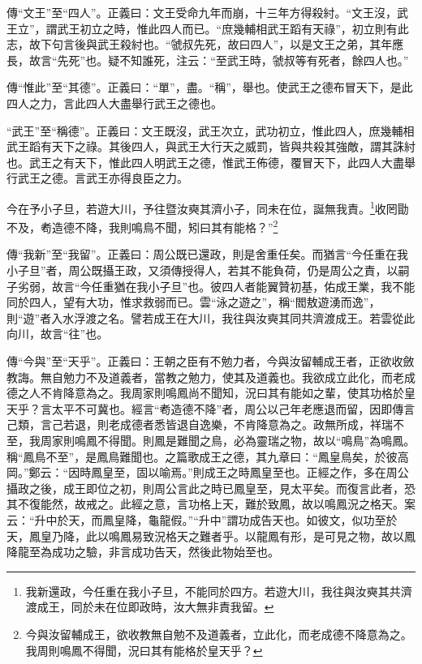 {\noindent\zhuan{}\fzbyks 傳“文王”至“四人”。正義曰：文王受命九年而崩，十三年方得殺紂。“文王沒，武王立”，謂武王初立之時，惟此四人而已。“庶幾輔相武王蹈有天祿”，初立則有此志，故下句言後與武王殺紂也。“虢叔先死，故曰四人”，以是文王之弟，其年應長，故言“先死”也。疑不知誰死，注云：“至武王時，虢叔等有死者，餘四人也。” \par}

{\noindent\zhuan{}\fzbyks 傳“惟此”至“其德”。正義曰：“單”，盡。“稱”，舉也。使武王之德布冒天下，是此四人之力，言此四人大盡舉行武王之德也。 \par}

{\noindent\shu{}\fzkt “武王”至“稱德”。正義曰：文王既沒，武王次立，武功初立，惟此四人，庶幾輔相武王蹈有天下之祿。其後四人，與武王大行天之威罰，皆與共殺其強敵，謂其誅紂也。武王之有天下，惟此四人明武王之德，惟武王佈德，覆冒天下，此四人大盡舉行武王之德。言武王亦得良臣之力。 \par}

今在予小子旦，若遊大川，予往暨汝奭其濟小子，同未在位，誕無我責。\footnote{我新還政，今任重在我小子旦，不能同於四方。若遊大川，我往與汝奭其共濟渡成王，同於未在位即政時，汝大無非責我留。}收罔勖不及，耇造德不降，我則鳴鳥不聞，矧曰其有能格？”\footnote{今與汝留輔成王，欲收教無自勉不及道義者，立此化，而老成德不降意為之。我周則鳴鳳不得聞，況曰其有能格於皇天乎？}


{\noindent\zhuan{}\fzbyks 傳“我新”至“我留”。正義曰：周公既已還政，則是舍重任矣。而猶言“今任重在我小子旦”者，周公既攝王政，又須傳授得人，若其不能負荷，仍是周公之責，以嗣子劣弱，故言“今任重猶在我小子旦”也。彼四人者能翼贊初基，佑成王業，我不能同於四人，望有大功，惟求救弱而已。雲“泳之遊之”，稱“閻敖遊湧而逸”，則“遊”者入水浮渡之名。譬若成王在大川，我往與汝奭其同共濟渡成王。若雲從此向川，故言“往”也。 \par}

{\noindent\zhuan{}\fzbyks 傳“今與”至“天乎”。正義曰：王朝之臣有不勉力者，今與汝留輔成王者，正欲收斂教誨。無自勉力不及道義者，當教之勉力，使其及道義也。我欲成立此化，而老成德之人不肯降意為之。我周家則鳴鳳尚不聞知，況曰其有能如之輩，使其功格於皇天乎？言太平不可冀也。經言“耇造德不降”者，周公以己年老應退而留，因即傳言己類，言己若退，則老成德者悉皆退自逸樂，不肯降意為之。政無所成，祥瑞不至，我周家則鳴鳳不得聞。則鳳是難聞之鳥，必為靈瑞之物，故以“鳴鳥”為鳴鳳。稱“鳳鳥不至”，是鳳鳥難聞也。之篇歌成王之德，其九章曰：“鳳皇鳥矣，於彼高岡。”鄭云：“因時鳳皇至，固以喻焉。”則成王之時鳳皇至也。正經之作，多在周公攝政之後，成王即位之初，則周公言此之時已鳳皇至，見太平矣。而復言此者，恐其不復能然，故戒之。此經之意，言功格上天，難於致鳳，故以鳴鳳況之格天。案云：“升中於天，而鳳皇降，龜龍假。”“升中”謂功成告天也。如彼文，似功至於天，鳳皇乃降，此以鳴鳳易致況格天之難者乎。以龍鳳有形，是可見之物，故以鳳降龍至為成功之驗，非言成功告天，然後此物始至也。 \par}

